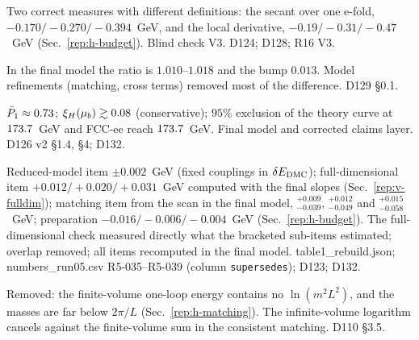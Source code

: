 \begin{description}
{Two correct measures with different definitions: the secant over one e-fold, $-0.170/\allowbreak{-}0.270/\allowbreak{-}0.394$~GeV, and the local derivative, $-0.19/\allowbreak{-}0.31/\allowbreak{-}0.47$~GeV (Sec.~\ref{rep:h-budget}).}
{Blind check V3.}
{D124; D128; R16 V3.}

{In the final model the ratio is $1.010$--$1.018$ and the bump $0.013$.}
{Model refinements (matching, cross terms) removed most of the difference.}
{D129 \S0.1.}

{$\bar P_1\approx0.73$; $\xi_H(\mu_b)\gtrsim0.08$ (conservative); $95\%$ exclusion of the theory curve at $173.7$~GeV and FCC-ee reach $173.7$~GeV.}
{Final model and corrected claims layer.}
{D126 v2 \S1.4, \S4; D132.}

{Reduced-model item $\pm0.002$~GeV (fixed couplings in $\delta E_{\rm DMC}$); full-dimensional item $+0.012/\allowbreak{+}0.020/\allowbreak{+}0.031$~GeV computed with the final slopes (Sec.~\ref{rep:v-fulldim}); matching item from the scan in the final model, $^{+0.009}_{-0.039}$, $^{+0.012}_{-0.049}$ and $^{+0.015}_{-0.058}$~GeV; preparation $-0.016/\allowbreak{-}0.006/\allowbreak{-}0.004$~GeV (Sec.~\ref{rep:h-budget}).}
{The full-dimensional check measured directly what the bracketed sub-items estimated; overlap removed; all items recomputed in the final model.}
{table1\_rebuild.json; numbers\_run05.csv R5-035--R5-039 (column \texttt{supersedes}); D123; D132.}

{Removed: the finite-volume one-loop energy contains no $\ln(m^2L^2)$, and the masses are far below $2\pi/L$ (Sec.~\ref{rep:h-matching}).}
{The infinite-volume logarithm cancels against the finite-volume sum in the consistent matching.}
{D110 \S3.5.}


\end{description}
